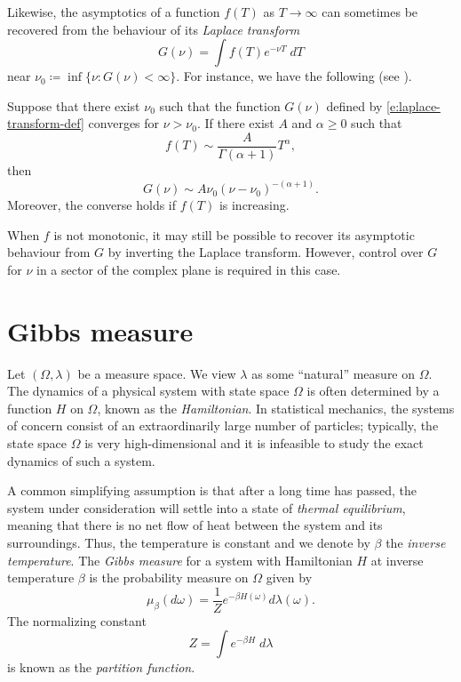 Likewise, the asymptotics of a function $f(T)$ as $T\to\infty$ can sometimes
be recovered from the behaviour of its \emph{Laplace transform}
\begin{equation}
\label{e:laplace-transform-def}
G(\nu) = \int f(T) e^{-\nu T} \; dT
\end{equation}
near $\nu_0 \coloneqq \inf \{ \nu : G(\nu) < \infty \}$.
For instance, we have the following (see \cite[Chapter V]{Widd41}).

\begin{theorem}
Suppose that there exist $\nu_0$ such that
the function $G(\nu)$ defined by \eqref{e:laplace-transform-def} converges for
$\nu > \nu_0$. If there exist $A$ and $\alpha \ge 0$ such that
\begin{equation}
f(T) \sim \frac{A}{\Gamma(\alpha + 1)} T^\alpha,
\end{equation}
then
\begin{equation}
G(\nu) \sim A \nu_0 (\nu - \nu_0)^{-(\alpha+1)}.
\end{equation}
Moreover, the converse holds if $f(T)$ is increasing.
\end{theorem}

When $f$ is not monotonic, it may still be possible to recover its asymptotic
behaviour from $G$ by inverting the Laplace transform. However, control over
$G$ for $\nu$ in a sector of the complex plane is required in this case.


\section{Gibbs measure}

Let $(\Omega, \lambda)$ be a measure space. We view $\lambda$ as some ``natural''
measure on $\Omega$.
The dynamics of a physical system with state space $\Omega$
is often determined by a function $H$ on $\Omega$, known as the \emph{Hamiltonian}.
In statistical mechanics, the systems of concern consist of an extraordinarily
large number of particles; typically, the state space $\Omega$ is very
high-dimensional and it is infeasible to study the exact dynamics of such a
system.

A common simplifying assumption is that after a long time has passed, the system
under consideration will settle into a state of \emph{thermal equilibrium}, meaning
that there is no net flow of heat between the system and its surroundings. Thus,
the temperature is constant and we denote by $\beta$ the \emph{inverse temperature}.
The \emph{Gibbs measure} for a system with Hamiltonian $H$ at inverse temperature
$\beta$ is the probability measure on $\Omega$ given by
\begin{equation}
\label{e:gibbs-def}
\mu_\beta(d\omega) = \frac{1}{Z} e^{-\beta H(\omega)} d\lambda(\omega).
\end{equation}
The normalizing constant
\begin{equation}
Z = \int e^{-\beta H} \; d\lambda
\end{equation}
is known as the \emph{partition function}.

